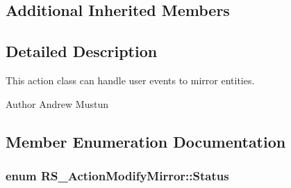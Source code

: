 \subsection*{Additional Inherited Members}


\subsection{Detailed Description}
This action class can handle user events to mirror entities.

\begin{DoxyAuthor}{Author}
Andrew Mustun 
\end{DoxyAuthor}


\subsection{Member Enumeration Documentation}
\hypertarget{classRS__ActionModifyMirror_a2b0598792e8e2cb2e7e5a516be92853c}{
\subsubsection[{Status}]{\setlength{\rightskip}{0pt plus 5cm}enum {\bf R\-S\-\_\-\-Action\-Modify\-Mirror\-::\-Status}}}\label{classRS__ActionModifyMirror_a2b0598792e8e2cb2e7e5a516be92853c}
